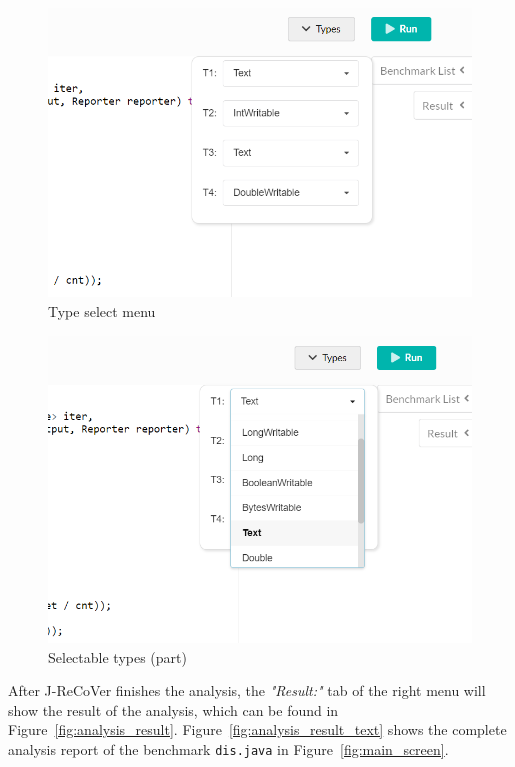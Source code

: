 \begin{figure}
\begin{center}
\includegraphics[width=.8\linewidth]{screenshots/type_select_menu}
\caption{Type select menu}
\label{fig:type_select_menu}
\end{center}
\end{figure}

\begin{figure}
\begin{center}
\includegraphics[width=.8\linewidth]{screenshots/selectable_types}
\caption{Selectable types (part)}
\label{fig:selectable_types}
\end{center}
\end{figure}

After J-ReCoVer finishes the analysis, the \emph{"Result:"} tab of the right menu will show the result of the analysis, which can be found in Figure~\ref{fig:analysis_result}. Figure~\ref{fig:analysis_result_text} shows the complete analysis report of the benchmark \texttt{dis.java} in Figure~\ref{fig:main_screen}.

